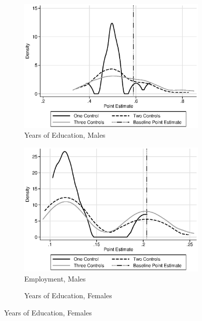 \begin{figure}
\centering
\caption{Sensitiviy to Choice of Control Set, Treatment vs. Next Best}\label{fig:senstnb}
\begin{subfigure}[h]{0.4\textwidth}
		\centering
		\caption{Years of Education, Males}
		\includegraphics[width=\textwidth]{output/sencontrols_male_years_30y_itt_wctrl.eps}
\end{subfigure}%
\begin{subfigure}[h]{0.4\textwidth}
	\centering
	\caption{Employment, Males}
		\includegraphics[width=\textwidth]{output/sencontrols_male_si30y_works_itt_wctrl.eps}
\end{subfigure}
\begin{subfigure}[h]{0.4\textwidth}
		\centering
		\caption{Years of Education, Females}

\end{subfigure}
\end{figure}
